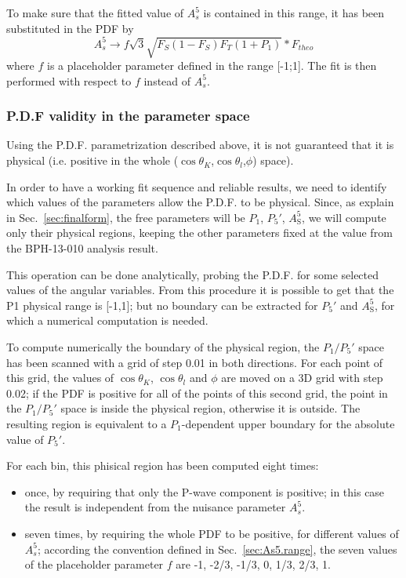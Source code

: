 To make sure that the fitted value of $A_s^5$ is contained in this range, it has been substituted in the PDF by
\begin{equation} \label{eq:As5.subst}
  A^5_s\to f\sqrt{3}\sqrt{F_S(1-F_S)F_T(1+P_1)}*F_{theo}
\end{equation}
where $f$ is a placeholder parameter defined in the range [-1;1]. The fit is then performed with respect to $f$ instead of $A_s^5$.

\subsubsection{P.D.F validity in the parameter space}
\label{sec:phys.bound}
Using the P.D.F. parametrization described above, it is not guaranteed that it is physical (i.e. positive in the whole ($\cos\theta_K$,$\cos\theta_l$,$\phi$) space).

In order to have a working fit sequence and reliable results, we need to identify which values of the parameters allow the P.D.F. to be physical. Since, as explain in Sec.~\ref{sec:finalform}, the free parameters will be $P_1$, $P_5'$, $A^5_\mathrm{S}$, we will compute only their physical regions, keeping the other parameters fixed at the value from the BPH-13-010 analysis result.

This operation can be done analytically, probing the P.D.F. for some selected values of the angular variables. From this procedure it is possible to get that the P1 physical range is [-1,1]; but no boundary can be extracted for $P_5'$ and $A^5_\mathrm{S}$, for which a numerical computation is needed.

To compute numerically the boundary of the physical region, the $P_1/P_5'$ space has been scanned with a grid of step 0.01 in both directions. For each point of this grid, the values of $\cos\theta_K$, $\cos\theta_l$ and $\phi$ are moved on a 3D grid with step 0.02; if the PDF is positive for all of the points of this second grid, the point in the $P_1/P_5'$ space is inside the physical region, otherwise it is outside. The resulting region is equivalent to a $P_1$-dependent upper boundary for the absolute value of $P_5'$.

For each bin, this phisical region has been computed eight times:
\begin{itemize}
\item once, by requiring that only the P-wave component is positive; in this case the result is independent from the nuisance parameter $A_s^5$.
\item seven times, by requiring the whole PDF to be positive, for different values of $A_s^5$; according the convention defined in Sec.~\ref{sec:As5.range}, the seven values of the placeholder parameter $f$ are {-1, -2/3, -1/3, 0, 1/3, 2/3, 1}.
\end{itemize}


